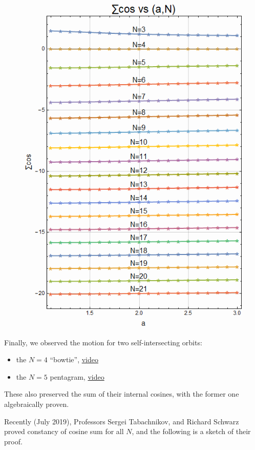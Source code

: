 \documentclass[]{article}
\providecommand{\tightlist}{%
  \setlength{\itemsep}{0pt}\setlength{\parskip}{0pt}}
\begin{document}
\begin{figure}[H]

{\centering \includegraphics[width=0.75\linewidth]{pics/sum_of_cosines_variable_n_and_a} 

}

\end{figure}

Finally, we observed the motion for two self-intersecting orbits:

\begin{itemize}
\tightlist
\item
  the \(N=4\) ``bowtie'', \href{https://youtu.be/cCYxN7ueGV4}{video}
\item
  the \(N=5\) pentagram, \href{https://youtu.be/ECe4DptduJY}{video}
\end{itemize}

These also preserved the sum of their internal cosines, with the former one algebraically proven.

Recently (July 2019), Professors Sergei Tabachnikov, and Richard Schwarz proved constancy of cosine sum for all \(N\), and the following is a sketch of their proof.
\end{document}
